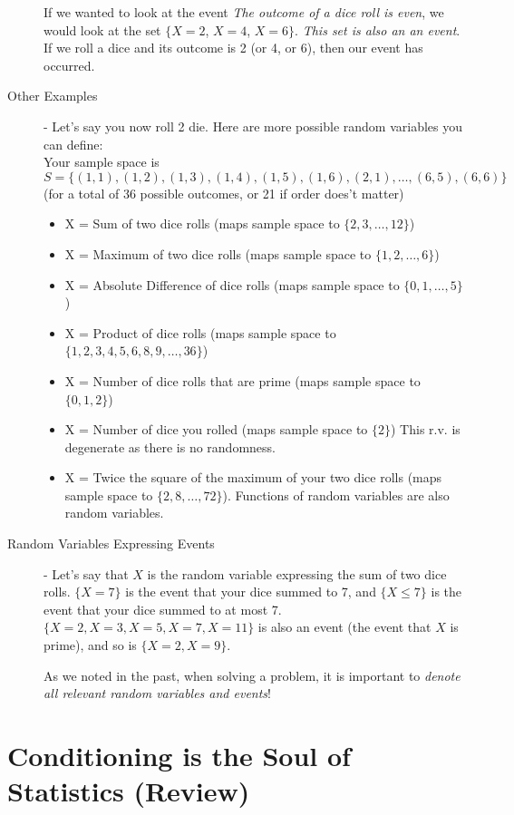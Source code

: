 \documentclass[11pt]{article}
\theoremstyle{definition}
\theoremstyle{remark}
\begin{document}
\begin{description}
If we wanted to look at the event \emph{The outcome of a dice roll is even}, we would look at the set $\{$$X=2$, $X=4$, $X=6$$\}$. \emph{This set is also an an event}. If we roll a dice and its outcome is 2 (or 4, or 6), then our event has occurred. 

	\item[Other Examples] - Let's say you now roll 2 die. Here are more possible random variables you can define: \\ Your sample space is $S = \{(1, 1), (1, 2), (1, 3), (1, 4), (1, 5), (1, 6), (2, 1), \dots, (6, 5), (6, 6)\}$ (for a total of 36 possible outcomes, or 21 if order does't matter)
	\begin{itemize}
		\item X = Sum of two dice rolls (maps sample space to $\{2, 3, \dots, 12\}$)
		\item X = Maximum of two dice rolls (maps sample space to $\{1, 2, \dots, 6\}$)
		\item X = Absolute Difference of dice rolls (maps sample space to $\{0, 1, \dots, 5\}$)
		\item X = Product of dice rolls (maps sample space to $\{1, 2, 3, 4, 5, 6, 8, 9, \dots, 36\}$)
		\item X = Number of dice rolls that are prime (maps sample space to $\{0, 1, 2\}$)
		\item X = Number of dice you rolled (maps sample space to $\{2\}$) This r.v. is degenerate as there is no randomness.
		\item X = Twice the square of the maximum of your two dice rolls (maps sample space to $\{2, 8, \dots, 72\}$). Functions of random variables are also random variables.
	\end{itemize}
	
	\item[Random Variables Expressing Events] - Let's say that $X$ is the random variable expressing the sum of two dice rolls. $\{X = 7\}$ is the event that your dice summed to 7, and $\{X \leq 7\}$ is the event that your dice summed to at most 7. $\{X = 2, X = 3, X = 5, X = 7, X = 11\}$ is also an event (the event that $X$ is prime), and so is $\{X = 2, X=9\}$.
	
	\Biohazard As we noted in the past, when solving a problem, it is important to \textit{denote all relevant random variables and events}!

\end{description}

\section{Conditioning is the Soul of Statistics (Review)}
\end{document}
